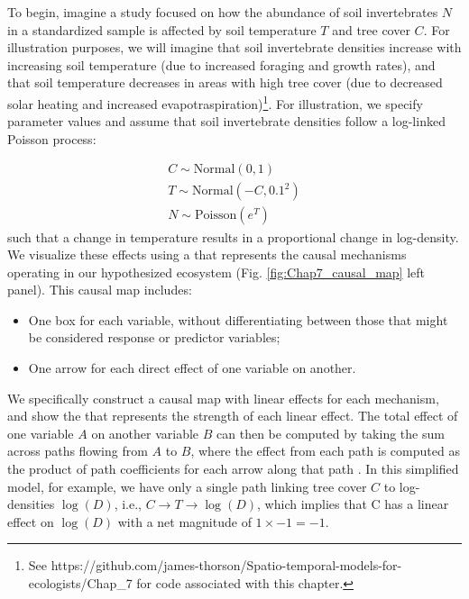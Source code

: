 To begin, imagine a study focused on how the abundance of soil invertebrates \(N\) in a standardized sample is affected by soil temperature \(T\) and tree cover \(C\).  For illustration purposes, we will imagine that soil invertebrate densities increase with increasing soil temperature (due to increased foraging and growth rates), and that soil temperature decreases in areas with high tree cover (due to decreased solar heating and increased evapotraspiration)\footnote{See https://github.com/james-thorson/Spatio-temporal-models-for-ecologists/Chap\_7 for code associated with this chapter.}.  For illustration, we specify parameter values and assume that soil invertebrate densities follow a log-linked Poisson process:

\begin{equation} \label{eq:Chap7_sem_example}
\begin{gathered}
   C \sim \mathrm{Normal}(0,1) \\ 
   T \sim \mathrm{Normal}(-C, 0.1^2) \\
   N \sim \mathrm{Poisson}(e^T)
\end{gathered}
\end{equation}
such that a change in temperature results in a proportional change in log-density.  We visualize these effects using a  that represents the causal mechanisms operating in our hypothesized ecosystem (Fig. \ref{fig:Chap7_causal_map} left panel).  This causal map includes:
\begin{itemize}
    \item One box for each variable, without differentiating between those that might be considered response or predictor variables;

    \item One arrow for each direct effect of one variable on another.
\end{itemize}
We specifically construct a causal map with linear effects for each mechanism, and show the  that represents the strength of each linear effect.  The total effect of one variable \(A\) on another variable \(B\) can then be computed by taking the sum across paths flowing from \(A\) to \(B\), where the effect from each path is computed as the product of path coefficients for each arrow along that path \cite{wright_method_1934}.  In this simplified model, for example, we have only a single path linking tree cover \(C\) to log-densities \(\log(D)\), i.e., \( C \rightarrow T \rightarrow \log(D) \), which implies that C has a linear effect on \(\log(D)\) with a net magnitude of \(1 \times -1 = -1\).

